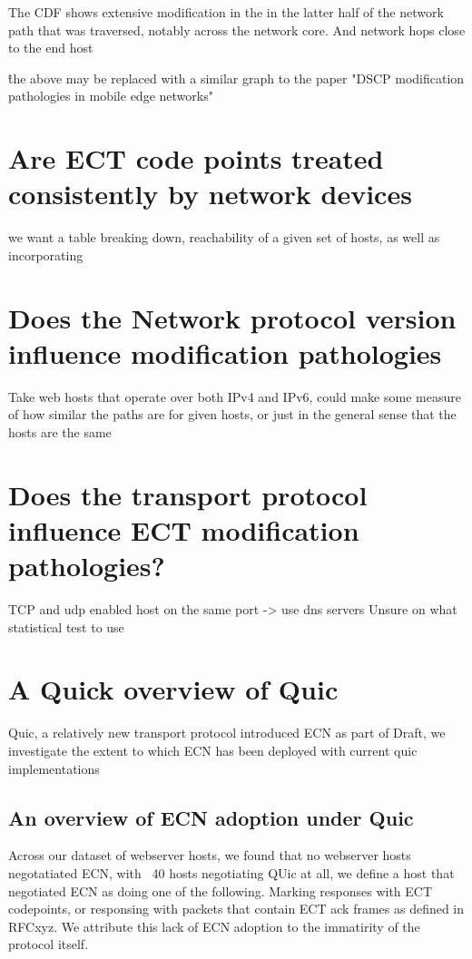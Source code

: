 \documentclass{l4proj}
\begin{document}
The CDF shows extensive modification in the in the latter half of the network path that was traversed, notably across the network core. And network hops close to the end host

\^ the above may be replaced with a similar graph to the paper "DSCP modification pathologies in mobile edge networks"

\section{Are ECT code points treated consistently by network devices}

we want a table breaking down, reachability of a given set of hosts, as well as incorporating


\section{Does the Network protocol version influence modification pathologies}

Take web hosts that operate over both IPv4 and IPv6, could make some measure of how similar the paths
are for given hosts, or just in the general sense that the hosts are the same


\section{Does the transport protocol influence ECT modification pathologies?}

TCP and udp enabled host on the same port -> use dns servers
Unsure on what statistical test to use


\section{A Quick overview of Quic}

Quic, a relatively new transport protocol introduced ECN as part of Draft, we investigate the extent to which ECN has been deployed with current quic implementations



\subsection{An overview of ECN adoption under Quic}

Across our dataset of webserver hosts, we found that no webserver hosts negotatiated ECN, with ~40 hosts negotiating QUic at all, we define a host that negotiated ECN as doing one of the following. Marking responses with ECT codepoints, or responsing with packets that contain ECT ack frames as defined in RFCxyz. We attribute this lack of ECN adoption to the immatirity of the protocol itself.
\end{document}
